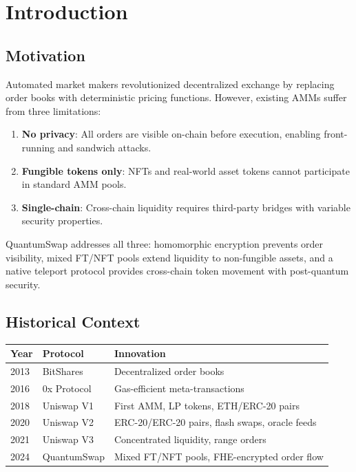 \section{Introduction}


\subsection{Motivation}

Automated market makers revolutionized decentralized exchange by
replacing order books with deterministic pricing functions. However,
existing AMMs suffer from three limitations:

\begin{enumerate}[nosep]
  \item \textbf{No privacy}: All orders are visible on-chain before
        execution, enabling front-running and sandwich attacks.
  \item \textbf{Fungible tokens only}: NFTs and real-world asset tokens
        cannot participate in standard AMM pools.
  \item \textbf{Single-chain}: Cross-chain liquidity requires third-party
        bridges with variable security properties.
\end{enumerate}

QuantumSwap addresses all three: homomorphic encryption prevents order
visibility, mixed FT/NFT pools extend liquidity to non-fungible assets,
and a native teleport protocol provides cross-chain token movement with
post-quantum security.

\subsection{Historical Context}

\begin{center}
\begin{tabular}{lll}
\toprule
\textbf{Year} & \textbf{Protocol} & \textbf{Innovation} \\
\midrule
2013 & BitShares & Decentralized order books \\
2016 & 0x Protocol & Gas-efficient meta-transactions \\
2018 & Uniswap V1 & First AMM, LP tokens, ETH/ERC-20 pairs \\
2020 & Uniswap V2 & ERC-20/ERC-20 pairs, flash swaps, oracle feeds \\
2021 & Uniswap V3 & Concentrated liquidity, range orders~\cite{uniswapv3} \\
2024 & QuantumSwap & Mixed FT/NFT pools, FHE-encrypted order flow \\
\bottomrule
\end{tabular}
\end{center}

